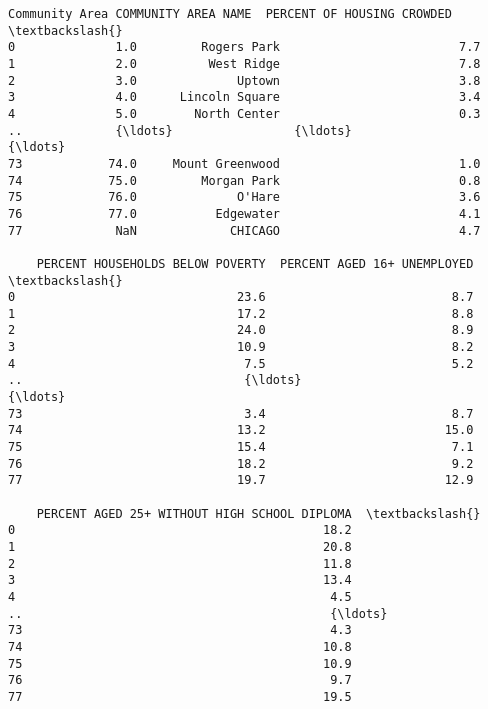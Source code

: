 \documentclass[11pt]{article}
\makeatletter
\newcommand{\boxspacing}{\kern\kvtcb@left@rule\kern\kvtcb@boxsep}
\newcommand{\prompt}[4]{
        \ttfamily\llap{{\color{#2}[#3]:\hspace{3pt}#4}}\vspace{-\baselineskip}
    }
\makeatother
\begin{document}
            \begin{tcolorbox}[breakable, size=fbox, boxrule=.5pt, pad at break*=1mm, opacityfill=0]
\prompt{Out}{outcolor}{9}{\boxspacing}
\begin{Verbatim}[commandchars=\\\{\}]
    Community Area COMMUNITY AREA NAME  PERCENT OF HOUSING CROWDED  \textbackslash{}
0              1.0         Rogers Park                         7.7
1              2.0          West Ridge                         7.8
2              3.0              Uptown                         3.8
3              4.0      Lincoln Square                         3.4
4              5.0        North Center                         0.3
..             {\ldots}                 {\ldots}                         {\ldots}
73            74.0     Mount Greenwood                         1.0
74            75.0         Morgan Park                         0.8
75            76.0              O'Hare                         3.6
76            77.0           Edgewater                         4.1
77             NaN             CHICAGO                         4.7

    PERCENT HOUSEHOLDS BELOW POVERTY  PERCENT AGED 16+ UNEMPLOYED  \textbackslash{}
0                               23.6                          8.7
1                               17.2                          8.8
2                               24.0                          8.9
3                               10.9                          8.2
4                                7.5                          5.2
..                               {\ldots}                          {\ldots}
73                               3.4                          8.7
74                              13.2                         15.0
75                              15.4                          7.1
76                              18.2                          9.2
77                              19.7                         12.9

    PERCENT AGED 25+ WITHOUT HIGH SCHOOL DIPLOMA  \textbackslash{}
0                                           18.2
1                                           20.8
2                                           11.8
3                                           13.4
4                                            4.5
..                                           {\ldots}
73                                           4.3
74                                          10.8
75                                          10.9
76                                           9.7
77                                          19.5


\end{Verbatim}
\end{tcolorbox}
\end{document}
